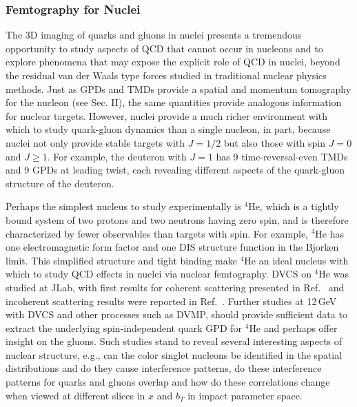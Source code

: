 \subsubsection{Femtography for Nuclei} 

The 3D imaging of quarks and gluons in nuclei presents a tremendous opportunity to study aspects of QCD that cannot occur in nucleons and to explore phenomena that may expose the explicit role of QCD in nuclei, beyond the residual van der Waals type forces studied in traditional nuclear physics methods. Just as GPDs and TMDs provide a spatial and momentum tomography for the nucleon (see Sec. II), the same quantities provide analogous information for nuclear targets. However, nuclei provide a much richer environment with which to study quark-gluon dynamics than a single nucleon, in part, because nuclei not only provide stable targets with $J=1/2$ but also those with spin $J=0$ and $J \geq 1$. For example, the deuteron with $J=1$ has 9 time-reversal-even TMDs and 9 GPDs at leading twist, each revealing different aspects of the quark-gluon structure of the deuteron.

Perhaps the simplest nucleus to study experimentally is $^4$He, which is a tightly bound system of two protons and two neutrons having zero spin, and is therefore characterized by fewer observables than targets with spin. For example, $^4$He has one electromagnetic form factor and one DIS structure function in the Bjorken limit. This simplified structure and tight binding make $^4$He an ideal nucleus with which to study QCD effects in nuclei via nuclear femtography. DVCS on $^4$He was studied at JLab, with first results for coherent scattering presented in Ref.~\cite{CLAS:2017udk} and incoherent scattering results were reported in Ref.~\cite{CLAS:2018ddh}. Further studies at 12\,GeV with DVCS and other processes such as DVMP, should provide sufficient data to extract the underlying spin-independent quark GPD for $^4$He and perhaps offer insight on the gluons. Such studies stand to reveal several interesting aspects of nuclear structure, e.g., can the color singlet nucleons be identified in the spatial distributions and do they cause interference patterns, do these interference patterns for quarks and gluons overlap and how do these correlations change when viewed at different slices in $x$ and $b_T$ in impact parameter space. 

